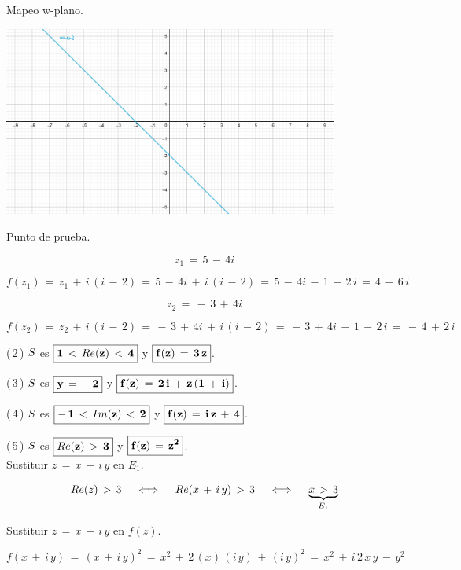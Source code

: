 \documentclass[a4paper,11pt,openany]{book}
\begin{document}
\textcolor{ao(english)}{} Mapeo w-plano.

\begin{center}
     \includegraphics[width=11cm]{Mapeo Ej 1 w.png}
\end{center}

\textcolor{ao(english)}{} Punto de prueba.

$$z_{1}\,=\,5\,-\,4i$$

$$f(z_{1})\,=\,z_{1}\,+\,i\,(i\,-\,2)\,=\,5\,-\,4i\,+\,i\,(i\,-\,2)\,=\,5\,-\,4i\,-\,1\,-\,2\,i\,=\,4\,-\,6\,i$$


$$z_{2}\,=\,-\,3\,+\,4i$$

$$f(z_{2})\,=\,z_{2}\,+\,i\,(i\,-\,2)\,=\,-\,3\,+\,4i\,+\,i\,(i\,-\,2)\,=\,-\,3\,+\,4i\,-\,1\,-\,2\,i\,=\,-\,4\,+\,2\,i$$

\textcolor{ao(english)}{(\,2\,)} $\mathnormal{S}$ es $\boxed{\bf{1\,<\,\mathnormal{Re}(z)\,<\,4}}$ y $\boxed{\bf{f(z)\,=\,3\,z}}$.

\textcolor{ao(english)}{(\,3\,)} $\mathnormal{S}$ es $\boxed{\bf{y\,=\,-\,2}}$ y $\boxed{\bf{f(z)\,=\,2\,i\,+\,z\,(1\,+\,i)}}$.

\textcolor{ao(english)}{(\,4\,)} $\mathnormal{S}$ es $\boxed{\bf{-\,1\,<\,\mathnormal{Im}(z)\,<\,2}}$ y $\boxed{\bf{f(z)\,=\,i\,z\,+\,4}}$.

\textcolor{ao(english)}{(\,5\,)} $\mathnormal{S}$ es $\boxed{\bf{\mathnormal{Re}(z)\,>\,3}}$ y $\boxed{\bf{f(z)\,=\,z^{2}}}$.\\

\textcolor{ao(english)}{} Sustituir $z\,=\,x\,+\,i\,y$ en $E_{1}$.

$$\mathnormal{Re}(z)\,>\,3 \quad\iff\quad \mathnormal{Re}(x\,+\,i\,y)\,>\,3 \quad\iff\quad \underbrace{x\,>\,3}_{E_{1}}$$

\textcolor{ao(english)}{} Sustituir $z\,=\,x\,+\,i\,y$ en $f(z)$.

$$f(x\,+\,i\,y)\,=\,(x\,+\,i\,y)^{2}\,=\,x^{2}\,+\,2\,(x)\,(i\,y)\,+\,(i\,y)^{2}\,=\,x^{2}\,+\,i\,2\,x\,y\,-\,y^{2}$$
\end{document}
